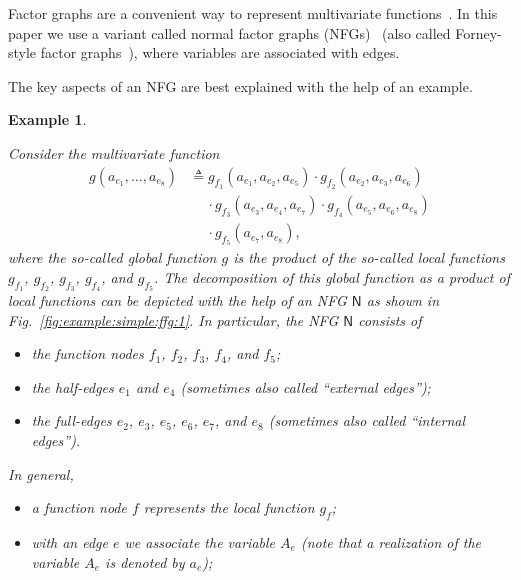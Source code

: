 \documentclass[journal, twocolumn]{IEEEtran}
\newcommand{\graph}[1]{\mathsf{#1}}
\newcommand{\defeq}{\triangleq}
\newcommand{\graphN}{\graph{N}}
\newcommand{\?}{\mathrm{?}}
\newtheorem{Example}[Lemma]{Example}
\begin{document}
Factor graphs are a convenient way to represent multivariate
functions~\cite{Kschischang:Frey:Loeliger:01}. In this paper we use a variant
called normal factor graphs (NFGs)~\cite{Forney:01:1} (also called
Forney-style factor graphs~\cite{Loeliger:04:1}), where variables are
associated with edges.

The key aspects of an NFG are best explained with the help of an
example.


\begin{Example}
  \label{example:simple:ffg:1}

  Consider the multivariate function
  \begin{align*}
    g(a_{e_1}, \ldots, a_{e_8})
      &\defeq
         g_{f_1}(a_{e_1}, a_{e_2}, a_{e_5})
         \cdot
         g_{f_2}(a_{e_2}, a_{e_3}, a_{e_6}) \\
      &\quad\ 
         \cdot
         g_{f_3}(a_{e_3}, a_{e_4}, a_{e_7})
         \cdot
         g_{f_4}(a_{e_5}, a_{e_6}, a_{e_8}) \\
      &\quad\ 
         \cdot
         g_{f_5}(a_{e_7}, a_{e_8}),
  \end{align*}
  where the so-called global function $g$ is the product of the so-called
  local functions $g_{f_1}$, $g_{f_2}$, $g_{f_3}$, $g_{f_4}$, and
  $g_{f_5}$. The decomposition of this global function as a product of local
  functions can be depicted with the help of an NFG $\graphN$ as shown in
  Fig.~\ref{fig:example:simple:ffg:1}. In particular, the NFG $\graphN$
  consists of
  \begin{itemize}
    
  \item the function nodes $f_1$, $f_2$, $f_3$, $f_4$, and $f_5$;

  \item the half-edges $e_1$ and $e_4$ (sometimes also called ``external
    edges'');

  \item the full-edges $e_2$, $e_3$, $e_5$, $e_6$, $e_7$, and $e_8$ (sometimes
    also called ``internal edges'').

  \end{itemize}
  In general,
  \begin{itemize}

  \item a function node $f$ represents the local function $g_f$;

  \item with an edge $e$ we associate the variable $A_e$ (note that a
    realization of the variable $A_e$ is denoted by $a_e$);


\end{itemize}
\end{Example}
\end{document}
